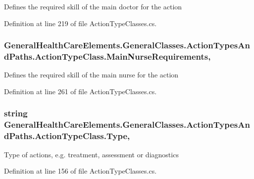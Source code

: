 Defines the required skill of the main doctor for the action 



Definition at line 219 of file Action\+Type\+Classes.\+cs.

\subsubsection[{\texorpdfstring{Main\+Nurse\+Requirements}{MainNurseRequirements}}]{ General\+Health\+Care\+Elements.\+General\+Classes.\+Action\+Types\+And\+Paths.\+Action\+Type\+Class.\+Main\+Nurse\+Requirements\hspace{0.3cm}{\ttfamily [get]}, {\ttfamily [set]}}\hypertarget{class_general_health_care_elements_1_1_general_classes_1_1_action_types_and_paths_1_1_action_type_class_a2efc81de0d542a4fe95e9a3afb7fe90c}{}\label{class_general_health_care_elements_1_1_general_classes_1_1_action_types_and_paths_1_1_action_type_class_a2efc81de0d542a4fe95e9a3afb7fe90c}


Defines the required skill of the main nurse for the action 



Definition at line 261 of file Action\+Type\+Classes.\+cs.

\subsubsection[{\texorpdfstring{Type}{Type}}]{\setlength{\rightskip}{0pt plus 5cm}string General\+Health\+Care\+Elements.\+General\+Classes.\+Action\+Types\+And\+Paths.\+Action\+Type\+Class.\+Type\hspace{0.3cm}{\ttfamily [get]}, {\ttfamily [set]}}\hypertarget{class_general_health_care_elements_1_1_general_classes_1_1_action_types_and_paths_1_1_action_type_class_a924754498f214c83cc3ba61c35d846f5}{}\label{class_general_health_care_elements_1_1_general_classes_1_1_action_types_and_paths_1_1_action_type_class_a924754498f214c83cc3ba61c35d846f5}


Type of actions, e.\+g. treatment, assessment or diagnostics 



Definition at line 156 of file Action\+Type\+Classes.\+cs.

